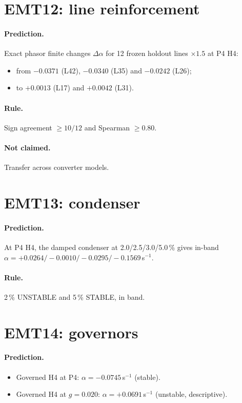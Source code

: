 \documentclass[10pt,a4paper]{article}
\newcommand{\sinv}{\,s$^{-1}$}
\begin{document}
\section{EMT12: line reinforcement}

\paragraph{Prediction.} Exact phasor finite changes $\Delta\alpha$ for 12
frozen holdout lines $\times1.5$ at P4 H4:
\begin{itemize}
\item from $-0.0371$ (L42), $-0.0340$ (L35) and $-0.0242$ (L26);
\item to $+0.0013$ (L17) and $+0.0042$ (L31).
\end{itemize}

\paragraph{Rule.} Sign agreement $\ge10/12$ and Spearman $\ge0.80$.

\paragraph{Not claimed.} Transfer across converter models.

\section{EMT13: condenser}

\paragraph{Prediction.} At P4 H4, the damped condenser at
2.0/2.5/3.0/5.0\,\% gives in-band $\alpha=+0.0264/-0.0010/-0.0295/-0.1569$\sinv.

\paragraph{Rule.} 2\,\% UNSTABLE and 5\,\% STABLE, in band.

\section{EMT14: governors}

\paragraph{Prediction.}
\begin{itemize}
\item Governed H4 at P4: $\alpha=-0.0745$\sinv{} (stable).
\item Governed H4 at $g=0.020$: $\alpha=+0.0691$\sinv{} (unstable,
  descriptive).
\end{itemize}
\end{document}
